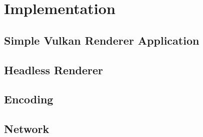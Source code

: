 \chapter{Implementation}
\section{Simple Vulkan Renderer Application}
\section{Headless Renderer}
\section{Encoding}
\section{Network}
